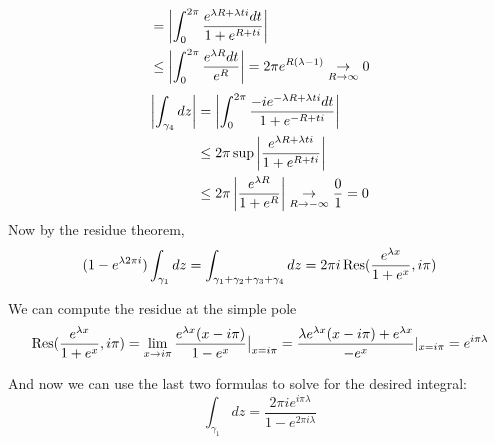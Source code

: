 \documentclass{homework}
\begin{document}
\begin{solution}
\begin{align*}
                                                                                    &= \left|\int_0^{2\pi} \frac{e^{\lambda R + \lambda ti} dt}{1 + e^{R+ti}}\right|\\
                                                                                    &\leq \left|\int_0^{2\pi} \frac{e^{\lambda R} dt}{e^{R}}\right| = 2\pi e^{R(\lambda - 1)} \underset{R\to\infty}{\to} 0
                                                                                    \end{align*}
                                                                                    \begin{align*}
                                                                                    \left|\int_{\gamma_4}dz\right| &= \left|\int_0^{2\pi} \frac{-ie^{-\lambda R + \lambda ti}dt}{1 + e^{-R+ti}}\right|\\
                                                                                    &\leq 2\pi \sup \left|\frac{e^{\lambda R+\lambda ti}}{1 + e^{R+ti}}\right|\\
                                                                                    &\leq 2\pi \left|\frac{e^{\lambda R}}{1 + e^{R}}\right| \underset{R\to -\infty}{\to} \frac{0}{1} = 0
                                                                                    \end{align*}
                                                                                    Now by the residue theorem, 
                                                                                    \[
                                                                                    (1-e^{\lambda 2\pi i})\int_{\gamma_1}dz= \int_{\gamma_1+\gamma_2+\gamma_3+\gamma_4} dz  =  2\pi i \operatorname{Res}(\frac{e^{\lambda x}}{1+e^x}, i\pi)
                                                                                    \]

                                                                                    We can compute the residue at the simple pole 
                                                                                    \[
                                                                                     \operatorname{Res}(\frac{e^{\lambda x}}{1+e^x}, i\pi) = \lim_{x\to i\pi} \frac{e^{\lambda x}(x-i\pi)}{1-e^x}\big|_{x=i\pi} = \frac{\lambda e^{\lambda x}(x-i\pi) + e^{\lambda x}}{-e^x}|_{x=i\pi} = e^{i\pi\lambda}
                                                                                     \]

                                                                                     And now we can use the last two formulas to solve for the desired integral:
                                                                                     \[
                                                                                     \int_{\gamma_1}dz = \frac{2\pi i e^{i\pi \lambda}}{1 - e^{2\pi i \lambda}}
                                                                                     \]
                                                                                     \end{solution}
\end{document}
